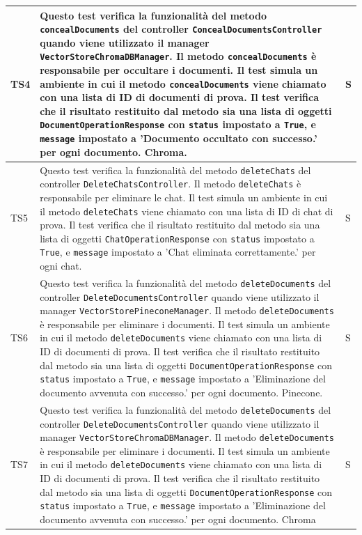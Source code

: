 \documentclass[10pt, a4paper]{article}
\begin{document}
\begin{xltabular}{\textwidth}{p{0.12\textwidth}|X|p{0.12\textwidth}}
    \hline
    TS4 & Questo test verifica la funzionalità del metodo \texttt{concealDocuments} del controller \texttt{ConcealDocumentsController} quando viene utilizzato il manager \texttt{VectorStoreChromaDBManager}. Il metodo \texttt{concealDocuments} è responsabile per occultare i documenti. Il test simula un ambiente in cui il metodo \texttt{concealDocuments} viene chiamato con una lista di ID di documenti di prova. Il test verifica che il risultato restituito dal metodo sia una lista di oggetti \texttt{DocumentOperationResponse} con \texttt{status} impostato a \texttt{True}, e \texttt{message} impostato a 'Documento occultato con successo.' per ogni documento. Chroma.  & S \\
    \hline
    TS5 & Questo test verifica la funzionalità del metodo \texttt{deleteChats} del controller \texttt{DeleteChatsController}. Il metodo \texttt{deleteChats} è responsabile per eliminare le chat. Il test simula un ambiente in cui il metodo \texttt{deleteChats} viene chiamato con una lista di ID di chat di prova. Il test verifica che il risultato restituito dal metodo sia una lista di oggetti \texttt{ChatOperationResponse} con \texttt{status} impostato a \texttt{True}, e \texttt{message} impostato a 'Chat eliminata correttamente.' per ogni chat.  & S \\
    \hline
    TS6 & Questo test verifica la funzionalità del metodo \texttt{deleteDocuments} del controller \texttt{DeleteDocumentsController} quando viene utilizzato il manager \texttt{VectorStorePineconeManager}. Il metodo \texttt{deleteDocuments} è responsabile per eliminare i documenti. Il test simula un ambiente in cui il metodo \texttt{deleteDocuments} viene chiamato con una lista di ID di documenti di prova. Il test verifica che il risultato restituito dal metodo sia una lista di oggetti \texttt{DocumentOperationResponse} con \texttt{status} impostato a \texttt{True}, e \texttt{message} impostato a 'Eliminazione del documento avvenuta con successo.' per ogni documento. Pinecone.  & S \\
    \hline
    TS7 & Questo test verifica la funzionalità del metodo \texttt{deleteDocuments} del controller \texttt{DeleteDocumentsController} quando viene utilizzato il manager \texttt{VectorStoreChromaDBManager}. Il metodo \texttt{deleteDocuments} è responsabile per eliminare i documenti. Il test simula un ambiente in cui il metodo \texttt{deleteDocuments} viene chiamato con una lista di ID di documenti di prova. Il test verifica che il risultato restituito dal metodo sia una lista di oggetti \texttt{DocumentOperationResponse} con \texttt{status} impostato a \texttt{True}, e \texttt{message} impostato a 'Eliminazione del documento avvenuta con successo.' per ogni documento. Chroma  & S \\

\end{xltabular}
\end{document}
